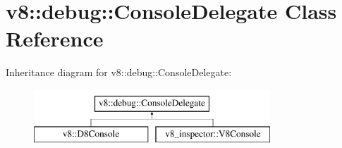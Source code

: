 \hypertarget{classv8_1_1debug_1_1ConsoleDelegate}{}\section{v8\+:\+:debug\+:\+:Console\+Delegate Class Reference}
\label{classv8_1_1debug_1_1ConsoleDelegate}
Inheritance diagram for v8\+:\+:debug\+:\+:Console\+Delegate\+:\begin{figure}[H]
\begin{center}
\leavevmode
\includegraphics[height=2.000000cm]{classv8_1_1debug_1_1ConsoleDelegate}
\end{center}
\end{figure}
